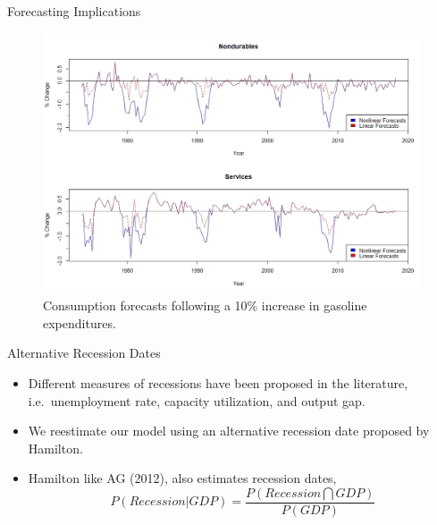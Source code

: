 \documentclass[
  10pt,
  ignorenonframetext,
]{beamer}
\begin{document}
\begin{frame}{Forecasting Implications}
\protect\hypertarget{forecasting-implications-1}{}

\begin{figure}
\centering
\includegraphics{Nondurables Services.jpeg}
\caption{Consumption forecasts following a 10\% increase in gasoline
expenditures.}
\end{figure}

\end{frame}

\begin{frame}{Alternative Recession Dates}
\protect\hypertarget{alternative-recession-dates}{}

\begin{itemize}
\item
  Different measures of recessions have been proposed in the literature,
  i.e.~unemployment rate, capacity utilization, and output gap.
\item
  We reestimate our model using an alternative recession date proposed
  by Hamilton.
\item
  Hamilton like AG (2012), also estimates recession dates,
  \[P(Recession|GDP)=\frac{P(Recession\bigcap GDP)}{P(GDP)}\]
\end{itemize}

\end{frame}
\end{document}
